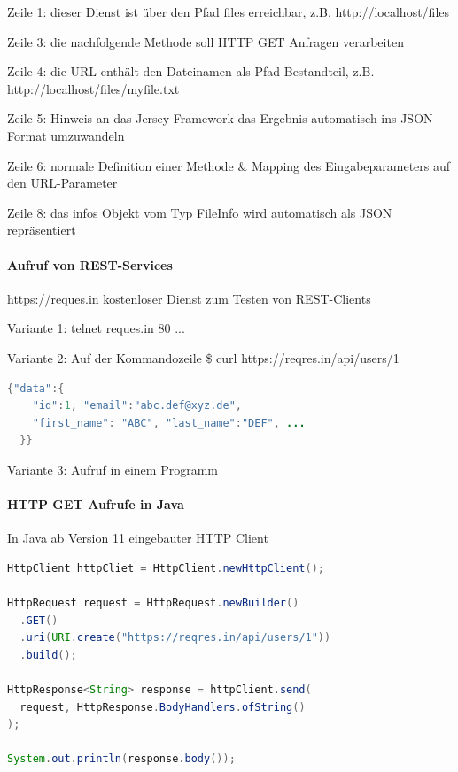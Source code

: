 \documentclass[10pt]{article}
\begin{document}
  \begin{itemize*}
    \item Zeile 1: dieser Dienst ist über den Pfad files erreichbar,
    z.B. http://localhost/files
    \item Zeile 3: die nachfolgende Methode soll HTTP GET Anfragen
    verarbeiten
    \item Zeile 4: die URL enthält den Dateinamen als
    Pfad-Bestandteil, z.B.
    http://localhost/files/myfile.txt
    \item Zeile 5: Hinweis an das Jersey-Framework das Ergebnis
    automatisch ins JSON Format umzuwandeln
    \item Zeile 6: normale Definition einer Methode \& Mapping des
    Eingabeparameters auf den URL-Parameter
    \item Zeile 8: das infos Objekt vom Typ FileInfo wird
    automatisch als JSON repräsentiert
  \end{itemize*}
  
  \paragraph{Aufruf von REST-Services}
  
  https://reques.in kostenloser Dienst zum Testen von REST-Clients
  \begin{itemize*}
    \item Variante 1: telnet reques.in 80 ...
    \item Variante 2: Auf der Kommandozeile \newline
    \$ curl https://reqres.in/api/users/1
    \begin{lstlisting}[language=java]
  {"data":{
    "id":1, "email":"abc.def@xyz.de",
    "first_name": "ABC", "last_name":"DEF", ...
  }}
  \end{lstlisting}
    \item Variante 3: Aufruf in einem Programm
  \end{itemize*}
  
  \paragraph{HTTP GET Aufrufe in Java}
  
  In Java ab Version 11 eingebauter HTTP Client
  \begin{lstlisting}[language=java]
HttpClient httpCliet = HttpClient.newHttpClient();

HttpRequest request = HttpRequest.newBuilder()
  .GET()
  .uri(URI.create("https://reqres.in/api/users/1"))
  .build();

HttpResponse<String> response = httpClient.send(
  request, HttpResponse.BodyHandlers.ofString()
);

System.out.println(response.body());
\end{lstlisting}
  
\end{document}
